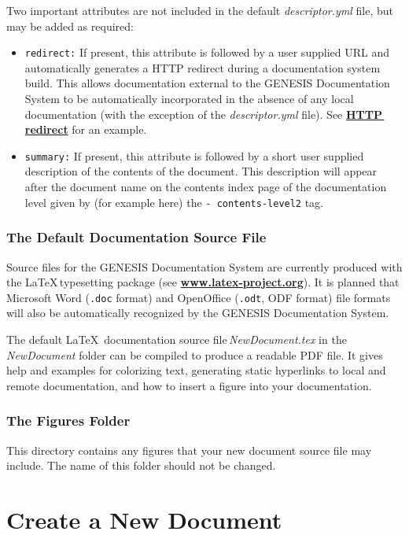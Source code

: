 \documentclass[12pt]{article}
\begin{document}
Two important attributes are not included in the default {\it descriptor.yml} file, but may be added as required:
\begin{itemize}
\item[]{\tt redirect:} If present, this attribute is followed by a user supplied URL and automatically generates a HTTP redirect during a documentation system build. This allows documentation external to the GENESIS Documentation System to be automatically incorporated in the absence of any local documentation (with the exception of the {\it descriptor.yml} file). See \href{../http-redirect/http-redirect.tex}{\bf HTTP\,redirect} for an example.
\item[]{\tt summary:} If present, this attribute is followed by a short user supplied description of the contents of the document. This description will appear after the document name on the contents index page of the documentation level given by (for example here) the {\tt -\,contents-level2} tag.

\end{itemize}

\subsubsection*{The Default Documentation Source File}

Source files for the GENESIS Documentation System are currently produced with the \LaTeX\,typesetting package (see \href{http://www.latex-project.org/}{\bf www.latex-project.org}). It is planned that Microsoft Word ({\tt .doc} format) and OpenOffice ({\tt .odt}, ODF format) file formats will also be automatically recognized by the GENESIS Documentation System.

The default \LaTeX\, documentation source file\,{\it NewDocument.tex} in the {\it NewDocument} folder can be compiled to produce a readable PDF file. It gives help and examples for colorizing text, generating static hyperlinks to local and remote documentation, and how to insert a figure into your documentation.

\subsubsection*{The Figures Folder}

This directory contains any figures that your new document source file may include. The name of this folder should not be changed.
 
\section*{Create a New Document}
\end{document}
